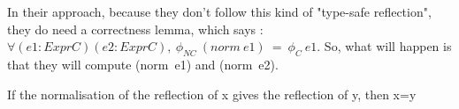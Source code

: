 \documentclass{llncs}
\begin{document}
In their approach, because they don't follow this kind of "type-safe reflection", they do need a correctness lemma, which says : \\
$\forall (e1:ExprC)(e2:ExprC),\ \phi_{NC}\ (norm\ e1)\ =\ \phi_C\ e1$.
So, what will happen is that they will compute (norm\ e1) and (norm\ e2). 






If the normalisation of the reflection of x gives the reflection of y, then x=y
\end{document}
